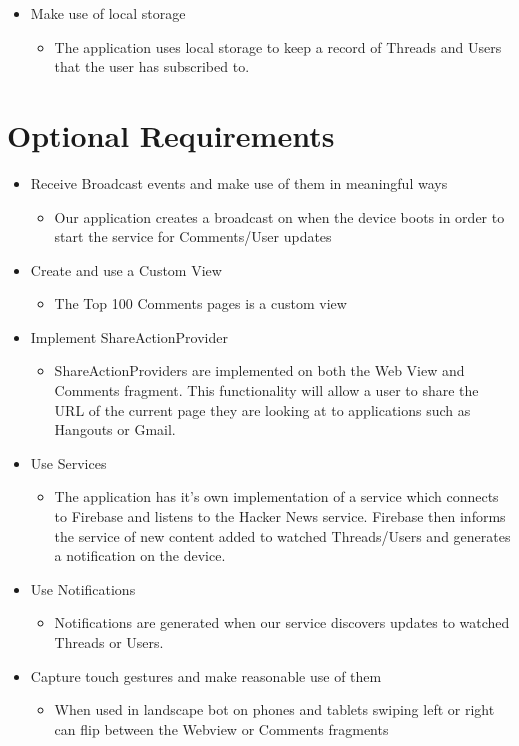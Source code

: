 \documentclass[11pt]{article}
\begin{document}
\begin{itemize}
	\item{Make use of local storage}
	\begin{itemize}
		\item{The application uses local storage to keep a record of Threads and Users that the user has subscribed to.}
	\end{itemize}
\end{itemize}

\section*{Optional Requirements}

\begin{itemize}
	\item{Receive Broadcast events and make use of them in meaningful ways}
	\begin{itemize}
		\item{Our application creates a broadcast on when the device boots in order to start the service for Comments/User updates}
	\end{itemize}
	\item{Create and use a Custom View}
	\begin{itemize}
		\item{The Top 100 Comments pages is a custom view}
	\end{itemize}
	\item{Implement ShareActionProvider}
	\begin{itemize}
		\item{ShareActionProviders are implemented on both the Web View and Comments fragment. This functionality will allow a user to share the URL of the current page they are looking at to applications such as Hangouts or Gmail.}
	\end{itemize}
	\item{Use Services}
	\begin{itemize}
		\item{The application has it’s own implementation of a service which connects to Firebase and listens to the Hacker News service. Firebase then informs the service of new content added to watched Threads/Users and generates a notification on the device.}
	\end{itemize}
	\item{Use Notifications}
	\begin{itemize}
		\item{Notifications are generated when our service discovers updates to watched Threads or Users.}
	\end{itemize}
	\item{Capture touch gestures and make reasonable use of them}
	\begin{itemize}
		\item{When used in landscape bot on phones and tablets swiping left or right can flip between the Webview or Comments fragments}
	\end{itemize}
\end{itemize}
\pagebreak
\end{document}
